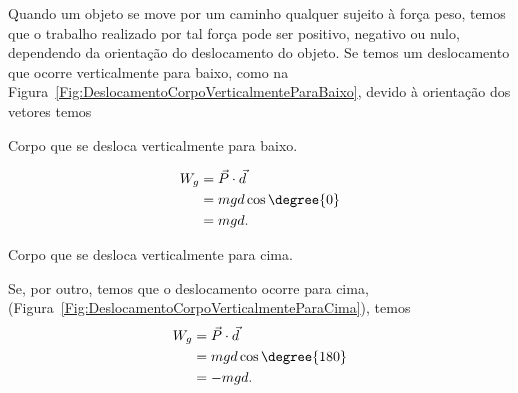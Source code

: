 Quando um objeto se move por um caminho qualquer sujeito à força peso, temos que o trabalho realizado por tal força pode ser positivo, negativo ou nulo, dependendo da orientação do deslocamento do objeto. Se temos um deslocamento que ocorre verticalmente para baixo, como na Figura~\ref{Fig:DeslocamentoCorpoVerticalmenteParaBaixo}, devido à orientação dos vetores temos
\begin{marginfigure}[-5cm]
\centering
{}
\caption{Corpo que se desloca verticalmente para baixo. \label{Fig:DeslocamentoCorpoVerticalmenteParaBaixo}}
\end{marginfigure}
\begin{align}
  W_g &= \vec{P}\cdot\vec{d} \\
  &= mgd\cos\degree{0} \\
  &= mgd.
\end{align}

\begin{marginfigure}
\centering
{}
\caption{Corpo que se desloca verticalmente para cima. \label{Fig:DeslocamentoCorpoVerticalmenteParaCima}}
\end{marginfigure}

\noindent{}Se, por outro, temos que o deslocamento ocorre para cima, (Figura~\ref{Fig:DeslocamentoCorpoVerticalmenteParaCima}), temos
\begin{align}
  W_g &= \vec{P}\cdot\vec{d} \\
  &= mgd\cos\degree{180} \\
  &= -mgd.
\end{align}

